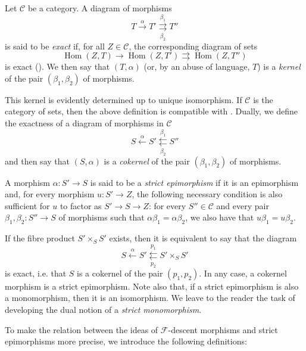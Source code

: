 \label{fga3.i-a.2.a}
\begin{definition}\label{fga3.i-a.2-definition-2.1}
    Let $\mathcal{C}$ be a category.
    A diagram of morphisms
    \[
        T \xrightarrow{\alpha}
        T' \overset{\beta_1}{\underset{\beta_2}{\rightrightarrows}}
        T''
    \]
    is said to be \emph{exact} if, for all $Z\in\mathcal{C}$, the corresponding diagram of sets
    \[
        \operatorname{Hom}(Z,T) \to
        \operatorname{Hom}(Z,T') \rightrightarrows
        \operatorname{Hom}(Z,T'')
    \]
    is exact ().
    We then say that $(T,\alpha)$ (or, by an abuse of language, $T$) is a \emph{kernel} of the pair $(\beta_1,\beta_2)$ of morphisms.
\end{definition}


This kernel is evidently determined up to unique isomorphism.
If $\mathcal{C}$ is the category of sets, then the above definition is compatible with .
Dually, we define the exactness of a diagram of morphisms in $\mathcal{C}$
\[
    S \xleftarrow{\alpha}
    S' \overset{\beta_1}{\underset{\beta_2}{\leftleftarrows}}
    S''
\]
and then say that $(S,\alpha)$ is a \emph{cokernel} of the pair $(\beta_1,\beta_2)$ of morphisms.


\begin{definition}\label{fga3.i-a.2-definition-2.2}
    A morphism $\alpha\colon S'\to S$ is said to be a \emph{strict epimorphism} if it is an epimorphism and, for every morphism $u\colon S'\to Z$, the following necessary condition is also sufficient for $u$ to factor as $S'\to S\to Z$:
    for every $S''\in\mathcal{C}$ and every pair $\beta_1,\beta_2\colon S''\to S$ of morphisms such that $\alpha\beta_1=\alpha\beta_2$, we also have that $u\beta_1=u\beta_2$.
\end{definition}


If the fibre product $S'\times_S S'$ exists, then it is equivalent to say that the diagram
\[
    S \xleftarrow{\alpha}
    S' \overset{p_1}{\underset{p_2}{\leftleftarrows}}
    S'\times_S S'
\]
is exact, i.e. that $S$ is a cokernel of the pair $(p_1,p_2)$.
In any case, a cokernel morphism is a strict epimorphism.
Note also that, if a strict epimorphism is also a monomorphism, then it is an isomorphism.
We leave to the reader the task of developing the dual notion of a \emph{strict monomorphism}.

To make the relation between the ideas of $\mathcal{F}$-descent morphisms and strict epimorphisms more precise, we introduce the following definitions:

